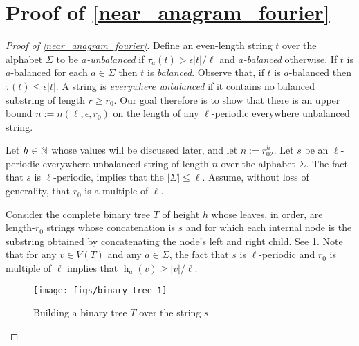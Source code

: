 \documentclass{patmorin}
\DeclareMathOperator{\hist}{h}
\begin{document}
\section{Proof of \cref{near_anagram_fourier}}
\label{near_anagram_proof}



\begin{proof}[Proof of \cref{near_anagram_fourier}]
    Define an even-length string $t$ over the alphabet $\Sigma$ to be \emph{$a$-unbalanced} if $\tau_a(t)>\epsilon|t|/\ell$ and \emph{$a$-balanced} otherwise.  If $t$ is $a$-balanced for each $a\in\Sigma$ then $t$ is \emph{balanced}. Observe that, if $t$ is $a$-balanced then $\tau(t)\le \epsilon|t|$. A string is \emph{everywhere unbalanced} if it contains no balanced substring of length $r\ge r_0$. Our goal therefore is to show that there is an upper bound $n:=n(\ell,\epsilon,r_0)$ on the length of any $\ell$-periodic everywhere unbalanced string.

    Let $h\in\mathbb{N}$ whose values will be discussed later, and let $n:=r_02^{h}$. Let $s$ be an $\ell$-periodic everywhere unbalanced string of length $n$ over the alphabet $\Sigma$.  The fact that $s$ is $\ell$-periodic, implies that the $|\Sigma|\le\ell$.  Assume, without loss of generality, that $r_0$ is a multiple of $\ell$.

    Consider the complete binary tree $T$ of height $h$ whose leaves, in order, are length-$r_0$ strings whose concatenation is $s$ and for which each internal node is the substring obtained by concatenating the node's left and right child.  See \cref{binary_tree}.  Note that for any $v\in V(T)$ and any $a\in\Sigma$, the fact that $s$ is $\ell$-periodic and $r_0$ is multiple of $\ell$ implies that $\hist_a(v)\ge |v|/\ell$.

    \begin{figure}
        \begin{center}
            \texttt{[image: figs/binary-tree-1]}
        \end{center}
        \caption{Building a binary tree $T$ over the string $s$.}
        \label{binary_tree}
    \end{figure}



\end{proof}
\end{document}
